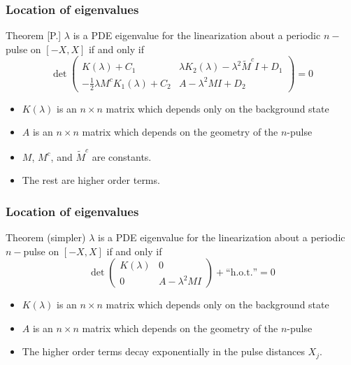 \documentclass[16pt]{beamer}
\begin{document}
\begin{frame}
\frametitle{Location of eigenvalues} 
	\fontsize{14}{7.2}\selectfont
    \begin{block}{Theorem [P.]}
    $\lambda$ is a PDE eigenvalue for the linearization about a periodic $n-$pulse on $[-X, X]$ if and only if 
    \[
    \det\begin{pmatrix}
K(\lambda) + C_1 & \lambda K_2(\lambda) - \lambda^2 \tilde{M}^c I + D_1 \\
-\frac{1}{2} \lambda M^c K_1(\lambda) + C_2 & A - \lambda^2 MI + D_2
\end{pmatrix} = 0
    \]
    \begin{itemize}
    	\item $K(\lambda)$ is an $n \times n$ matrix which depends only on the background state
    	\item $A$ is an $n \times n$ matrix which depends on the geometry of the $n$-pulse
    	\item $M$, $M^c$, and $\tilde{M}^c$ are constants.
    	\item The rest are higher order terms.
    \end{itemize}
    \end{block}
\end{frame}

\begin{frame}
\frametitle{Location of eigenvalues} 
	\fontsize{14}{7.2}\selectfont
    \begin{block}{Theorem (simpler)}
    $\lambda$ is a PDE eigenvalue for the linearization about a periodic $n-$pulse on $[-X, X]$ if and only if 
    \[
    \det\begin{pmatrix}K(\lambda) & 0 \\ 0 & A - \lambda^2  M I \end{pmatrix} + \text{``h.o.t.''} = 0
    \]
    \begin{itemize}
    	\item $K(\lambda)$ is an $n \times n$ matrix which depends only on the background state
    	\item $A$ is an $n \times n$ matrix which depends on the geometry of the $n$-pulse
    	\item The higher order terms decay exponentially in the pulse distances $X_j$.
    \end{itemize}
    \end{block}
\end{frame}
\end{document}

